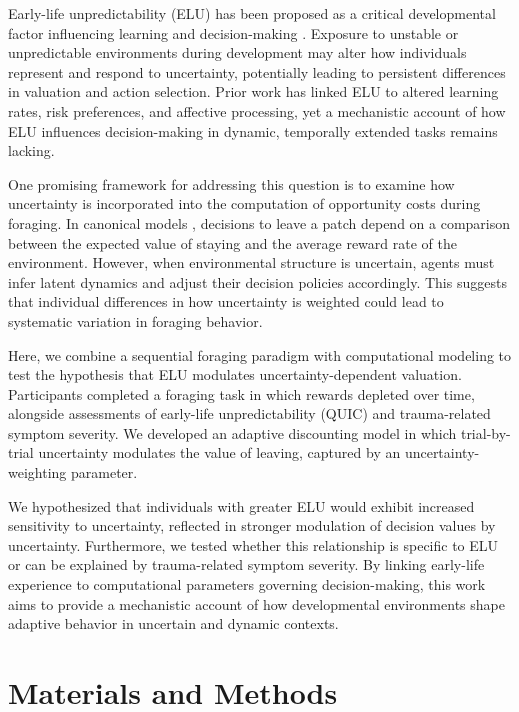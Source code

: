 \documentclass[12pt]{article}
\begin{document}
Early-life unpredictability (ELU) has been proposed as a critical developmental factor influencing learning and decision-making \citep{harhen2025developmental,decker2025exploration,rachum2025early}. Exposure to unstable or unpredictable environments during development may alter how individuals represent and respond to uncertainty, potentially leading to persistent differences in valuation and action selection. Prior work has linked ELU to altered learning rates, risk preferences, and affective processing, yet a mechanistic account of how ELU influences decision-making in dynamic, temporally extended tasks remains lacking.

One promising framework for addressing this question is to examine how uncertainty is incorporated into the computation of opportunity costs during foraging. In canonical models \citep{charnov1976optimal,sutton1988learning}, decisions to leave a patch depend on a comparison between the expected value of staying and the average reward rate of the environment. However, when environmental structure is uncertain, agents must infer latent dynamics and adjust their decision policies accordingly. This suggests that individual differences in how uncertainty is weighted could lead to systematic variation in foraging behavior.

Here, we combine a sequential foraging paradigm with computational modeling to test the hypothesis that ELU modulates uncertainty-dependent valuation. Participants completed a foraging task in which rewards depleted over time, alongside assessments of early-life unpredictability (QUIC) and trauma-related symptom severity. We developed an adaptive discounting model in which trial-by-trial uncertainty modulates the value of leaving, captured by an uncertainty-weighting parameter.

We hypothesized that individuals with greater ELU would exhibit increased sensitivity to uncertainty, reflected in stronger modulation of decision values by uncertainty. Furthermore, we tested whether this relationship is specific to ELU or can be explained by trauma-related symptom severity. By linking early-life experience to computational parameters governing decision-making, this work aims to provide a mechanistic account of how developmental environments shape adaptive behavior in uncertain and dynamic contexts.


\section*{Materials and Methods}
\end{document}
